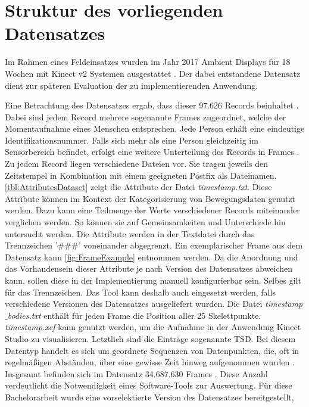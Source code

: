 \section{Struktur des vorliegenden Datensatzes}
\label{2-StrukturDatensatz}
Im Rahmen eines Feldeinsatzes wurden im Jahr 2017 Ambient Displays für 18 Wochen mit Kinect v2 Systemen ausgestattet \citep{schwarzer_spontaneous_2021}.
Der dabei entstandene Datensatz dient zur späteren Evaluation der zu implementierenden Anwendung.

Eine Betrachtung des Datensatzes ergab, dass dieser 97.626 Records beinhaltet \citep{temiz_konzeption_2022}.
Dabei sind jedem Record mehrere sogenannte Frames zugeordnet,
welche der Momentaufnahme eines Menschen entsprechen.
Jede Person erhält eine eindeutige Identifikationsnummer.
Falls sich mehr als eine Person gleichzeitig im Sensorbereich befindet,
erfolgt eine weitere Unterteilung des Records in Frames \citep{temiz_konzeption_2022}.
Zu jedem Record liegen verschiedene Dateien vor.
Sie tragen jeweils den Zeitstempel in Kombination mit einem geeigneten Postfix als Dateinamen.
\autoref{tbl:AttributesDataset} zeigt die Attribute der Datei \emph{timestamp.txt}.
Diese Attribute können im Kontext der Kategorisierung von Bewegungsdaten genutzt werden.
Dazu kann eine Teilmenge der Werte verschiedener Records miteinander verglichen werden.
So können sie auf Gemeinsamkeiten und Unterschiede hin untersucht werden.
Die Attribute werden in der Textdatei durch das Trennzeichen '\#\#\#' voneinander abgegrenzt.
Ein exemplarischer Frame aus dem Datensatz kann \autoref{fig:FrameExample} entnommen werden.
Da die Anordnung und das Vorhandensein dieser Attribute je nach Version des Datensatzes abweichen kann,
sollen diese in der Implementierung manuell konfigurierbar sein.
Selbes gilt für das Trennzeichen.
Das Tool kann deshalb auch eingesetzt werden,
falls verschiedene Versionen des Datensatzes ausgeliefert wurden.
Die Datei \emph{timestamp$\_$bodies.txt} enthält für jeden Frame die Position aller 25 Skelettpunkte.
\emph{timestamp.xef} kann genutzt werden, um die Aufnahme in der Anwendung Kinect Studio zu visualisieren.
Letztlich sind die Einträge sogenannte \ac{TSD}.
Bei diesem Datentyp handelt es sich um geordnete Sequenzen von Datenpunkten,
die, oft in regelmäßigen Abständen, über eine gewisse Zeit hinweg aufgenommen wurden \citep{ali_clustering_2019}.
Insgesamt befinden sich im Datensatz 34.687.630 Frames \citep{temiz_konzeption_2022}.
Diese Anzahl verdeutlicht die Notwendigkeit eines Software-Tools zur Auswertung.
Für diese Bachelorarbeit wurde eine vorselektierte Version des Datensatzes bereitgestellt,
